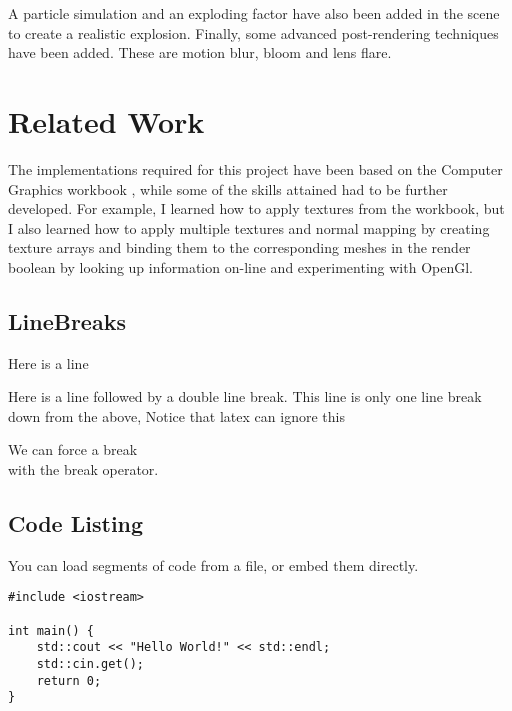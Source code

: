 \documentclass[10pt, a4paper]{article}
\begin{document}
     A particle simulation and an exploding factor have also been added in the scene to create a realistic explosion. Finally, some advanced post-rendering techniques have been added. These are motion blur, bloom and lens flare.
    
    
	
	\section{Related Work}
	\iffalse
	\paragraph{Formatting}
	Some common formatting you may need uses these commands for \textbf{Bold Text}, \textit{Italics}, and \underline{underlined}.
	\fi
	
	The implementations required for this project have been based on the Computer Graphics workbook \cite{Workbook}, while some of the skills attained had to be further developed. For example, I learned how to apply textures from the workbook, but I also learned how to apply multiple textures and normal mapping by creating texture arrays and binding them to the corresponding meshes in the render boolean by looking up information on-line and experimenting with OpenGl.
	
	\iffalse
	
	\subsection{LineBreaks}
	Here is a line
    
    Here is a line followed by a double line break.
	This line is only one line break down from the above, Notice that latex can ignore this
    
    We can force a break \\ with the break operator.
	
	\subsection{Code Listing}
    You can load segments of code from a file, or embed them directly.
    
\begin{lstlisting}[caption = Hello World! in c++]
#include <iostream>

int main() {
    std::cout << "Hello World!" << std::endl;
    std::cin.get();
    return 0;
}
\end{lstlisting}
\end{document}
